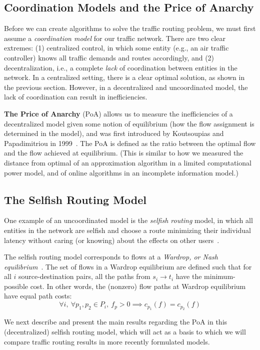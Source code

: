 \documentclass[acmlarge]{acmart}
\begin{document}
\subsection{Coordination Models and the Price of Anarchy}
Before we can create algorithms to solve the traffic routing problem, we must first assume a \emph{coordination model} for our traffic network.
There are two clear extremes: (1) centralized control, in which some entity (e.g., an air traffic controller) knows all traffic demands and routes accordingly, and
(2) decentralization, i.e., a complete \emph{lack} of coordination between
entities in the network.
In a centralized setting, there is a clear optimal solution, as shown in the previous section.
However, in a decentralized and uncoordinated model, the lack of coordination can result in
inefficiencies. 

\medskip
\textbf{The Price of Anarchy} (PoA) allows us to measure the inefficiencies of a decentralized model given some notion of equilibrium (how the flow assignment is determined in the model), and was first introduced by Koutsoupias and Papadimitriou in 1999~\cite{poa}. 
The PoA is defined as the ratio between the optimal flow and the flow achieved
at equilibrium.
(This is similar to how we measured the distance from optimal of an approximation algorithm in a limited computational power model, and of online algorithms in an incomplete information model.)

\subsection{The Selfish Routing Model}
One example of an uncoordinated model is the \emph{selfish routing} model, in which all entities in the network are selfish and choose a route minimizing their individual latency without caring (or knowing) about the effects on other users~\cite{tardos}.

The selfish routing model corresponds to flows at a \emph{Wardrop, or Nash equilibrium}~\cite{wardrop,haurie}.
The set of flows in a Wardrop equilibrium are defined such that for all $i$ source-destination pairs, all the paths from $s_i \to t_i$ have the minimum-possible cost. In other words, the (nonzero) 
flow paths at Wardrop equilibrium have equal path costs: 
$$\forall i,~\forall p_1, p_2\in P_i,~f_p > 0 \implies c_{p_1}(f) = c_{p_2}(f)$$


We next describe and present the main results regarding the PoA in this (decentralized) selfish routing model, which will act as a basis to which we will compare traffic routing results in more recently formulated models.
\end{document}
